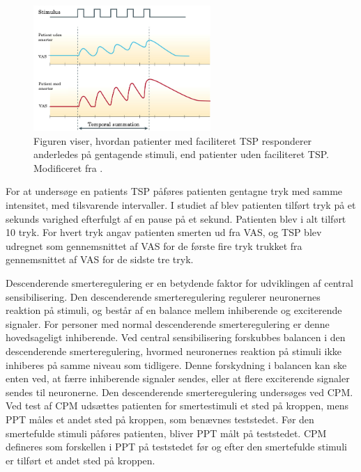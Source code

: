 \begin{figure}[H] 
	\begin{center}
		\includegraphics[width=0.6\textwidth]{figures/dHTAanalyse/TSP_rask_syg}
	\end{center}
	\caption{Figuren viser, hvordan patienter med faciliteret TSP responderer anderledes på gentagende stimuli, end patienter uden faciliteret TSP. Modificeret fra .} 
	\label{fig:TSP_rask_syg} 
\end{figure} \vspace{-.25cm}

For at undersøge en patients TSP påføres patienten gentagne tryk med samme intensitet, med tilsvarende intervaller. I studiet af  blev patienten tilført tryk på et sekunds varighed efterfulgt af en pause på et sekund. Patienten blev i alt tilført 10 tryk. For hvert tryk angav patienten smerten ud fra VAS, og TSP blev udregnet som gennemsnittet af VAS for de første fire tryk trukket fra gennemsnittet af VAS for de sidste tre tryk. \citep{Petersen2016}

Descenderende smerteregulering er en betydende faktor for udviklingen af central sensibilisering. Den descenderende smerteregulering regulerer neuronernes reaktion på stimuli, og består af en balance mellem inhiberende og exciterende signaler. For personer med normal descenderende smerteregulering er denne hovedsageligt inhiberende. Ved central sensibilisering forskubbes balancen i den descenderende smerteregulering, hvormed neuronernes reaktion på stimuli ikke inhiberes på samme niveau som tidligere. Denne forskydning i balancen kan ske enten ved, at færre inhiberende signaler sendes, eller at flere exciterende signaler sendes til neuronerne. \citep{Arendt-Nielsen2015b} Den descenderende smerteregulering undersøges ved CPM. Ved test af CPM udsættes patienten for smertestimuli et sted på kroppen, mens PPT måles et andet sted på kroppen, som benævnes teststedet. Før den smertefulde stimuli påføres patienten, bliver PPT målt på teststedet. \citep{Petersen2016} CPM defineres som forskellen i PPT på teststedet før og efter den smertefulde stimuli er tilført et andet sted på kroppen. \citep{Petersen2015} 

